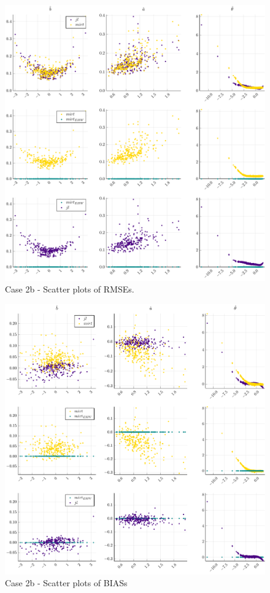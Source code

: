 \begin{figure}[ht]
	\centering
	\includegraphics[width=\textwidth]{Figures/2b/RMSEscatter.pdf}
	\caption{Case 2b - Scatter plots of RMSEs.}
	\label{fig:spRMSE2b}
\end{figure}
\begin{figure}[ht]
	\centering
	\includegraphics[width=\textwidth]{Figures/2b/BIASscatter.pdf}
	\caption{Case 2b - Scatter plots of BIASs }
	\label{fig:spBIAS2b}
\end{figure}
